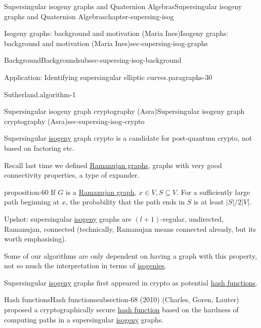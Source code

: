 \documentclass[oneside,10pt,]{book}
\numberwithin{equation}{section}
\begin{document}
\begin{chapterptx}{Supersingular isogeny graphs and Quaternion Algebras}{}{Supersingular isogeny graphs and Quaternion Algebras}{}{}{chapter-supersing-isog}
\begin{sectionptx}{Isogeny graphs: background and motivation (Maria Ines)}{}{Isogeny graphs: background and motivation (Maria Ines)}{}{}{sec-supersing-isog-graphs}
\begin{subsectionptx}{Background}{}{Background}{}{}{subsec-supersing-isog-background}
\begin{paragraphs}{Application: Identifying supersingular elliptic curves.}{paragraphs-30}
\begin{algorithm}{Sutherland.}{}{algorithm-1}
\begin{enumerate}
\end{enumerate}
%
\end{algorithm}
\end{paragraphs}%
\end{subsectionptx}
\end{sectionptx}
%
%
\typeout{************************************************}
\typeout{************************************************}
%
\begin{sectionptx}{Supersingular isogeny graph cryptography (Asra)}{}{Supersingular isogeny graph cryptography (Asra)}{}{}{sec-supersing-isog-crypto}
\begin{introduction}{}%
\hypertarget{p-823}{}%
Supersingular \hyperref[def-supersing-isog-isog]{isogeny} graph crypto is a candidate for post-quantum crypto, not based on factoring etc.%
\par
\hypertarget{p-824}{}%
Recall last time we defined \hyperref[def-supersing-isog-ramanujan]{Ramanujan graphs}, graphs with very good connectivity properties, a type of expander.%
\begin{proposition}{}{}{proposition-60}%
\hypertarget{p-825}{}%
If \(G\) is a \hyperref[def-supersing-isog-ramanujan]{Ramanujan graph}, \(x\in V, S\subseteq V\). For a sufficiently large path beginning at \(x\), the probability that the path ends in \(S\) is at least \(|S|/2|V|\).%
\end{proposition}
\hypertarget{p-826}{}%
Upshot: supersingular \hyperref[def-supersing-isog-isog]{isogeny} graphs are \((l +1)\)-regular, undirected, Ramanujan, connected (technically, Ramanujan means connected already, but its worth emphasising).%
\par
\hypertarget{p-827}{}%
Some of our algorithms are only dependent on having a graph with this property, not so much the interpretation in terms of \hyperref[def-supersing-isog-isog]{isogenies}.%
\par
\hypertarget{p-828}{}%
Supersingular \hyperref[def-supersing-isog-isog]{isogeny} graphs first appeared in crypto as potential \hyperref[def-hash-function]{hash functions}.%
\end{introduction}%
%
%
\typeout{************************************************}
\typeout{************************************************}
%
\begin{subsectionptx}{Hash functions}{}{Hash functions}{}{}{subsection-68}
\hypertarget{p-829}{}%
(2010) (Charles, Goren, Lauter) proposed a cryptographically secure \hyperref[def-hash-function]{hash function} based on the hardness of computing paths in a supersingular \hyperref[def-supersing-isog-isog]{isogeny} graphs.%

\end{subsectionptx}
\end{sectionptx}
\end{chapterptx}
\end{document}
